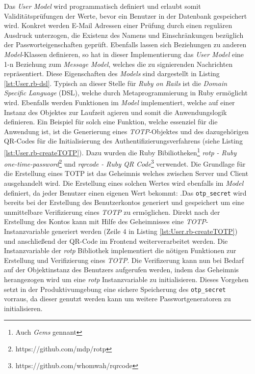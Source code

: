 \documentclass[11pt,a4paper,ngerman]{scrreprt}
\begin{document}
Das \textit{User Model} wird programmatisch definiert und erlaubt somit Validitätsprüfungen der Werte, bevor ein Benutzer in der Datenbank gespeichert wird. Konkret werden E-Mail Adressen einer Prüfung durch einen regulären Ausdruck unterzogen, die Existenz des Namens und Einschränkungen bezüglich der Passworteigenschaften geprüft. Ebenfalls lassen sich Beziehungen zu anderen \textit{Model}-Klassen definieren, so hat in dieser Implementierung das \textit{User Model} eine 1-n Beziehung zum \textit{Message Model}, welches die zu signierenden Nachrichten repräsentiert. Diese Eigenschaften des \textit{Models} sind dargestellt in Listing \ref{lst:User.rb-dsl}. Typisch an dieser Stelle für \textit{Ruby on Rails} ist die \textit{Domain Specific Language} (DSL), welche durch Metaprogrammierung in Ruby ermöglicht wird. Ebenfalls werden Funktionen im \textit{Model} implementiert, welche auf einer Instanz des Objektes zur Laufzeit agieren und somit die Anwendungslogik definieren. Ein Beispiel für solch eine Funktion, welche essenziel für die Anwendung ist, ist die Generierung eines \textit{TOTP}-Objektes und des dazugehörigen QR-Codes für die Initialisierung des Authentifizierungsverfahrens (siehe Listing \ref{lst:User.rb-createTOTP}). Dazu wurden die Ruby Bibiliotheken\footnote{Auch \textit{Gems} gennant} \textit{rotp - Ruby one-time-password}\footnote{https://github.com/mdp/rotp} und \textit{rqrcode - Ruby QR Code}\footnote{https://github.com/whomwah/rqrcode} verwendet. Die Grundlage für die Erstellung eines TOTP ist das Geheimnis welches zwischen Server und Client ausgehandelt wird. Die Erstellung eines solchen Wertes wird ebenfalls im \textit{Model} definiert, da jeder Benutzer einen eigenen Wert bekommt:  .Das \texttt{otp\_secret} wird bereits bei der Erstellung des Benutzerkontos generiert und gespeichert um eine unmittelbare Verifizierung eines \textit{TOTP} zu ermöglichen. Direkt nach der Erstellung des Kontos kann mit Hilfe des Geheimnisses eine \textit{TOTP}-Instanzvariable  generiert werden (Zeile 4 in Listing \ref{lst:User.rb-createTOTP}) und anschließend der QR-Code im Frontend weiterverarbeitet werden. Die Instanzvariable der \textit{rotp} Bibliothek implementiert die nötigen Funktionen zur Erstellung und Verifizierung eines \textit{TOTP}. Die Verifizerung kann nun bei Bedarf auf der Objektinstanz des Benutzers aufgerufen werden, indem das Geheimnis herangezogen wird um eine \textit{rotp} Instanzvariable zu initialisieren. Dieses Vorgehen setzt in der Produktivumgebung eine sichere Speicherung des \texttt{otp\_secret} vorraus, da dieser genutzt werden kann um weitere Passwortgeneratoren zu initialisieren.
\end{document}

